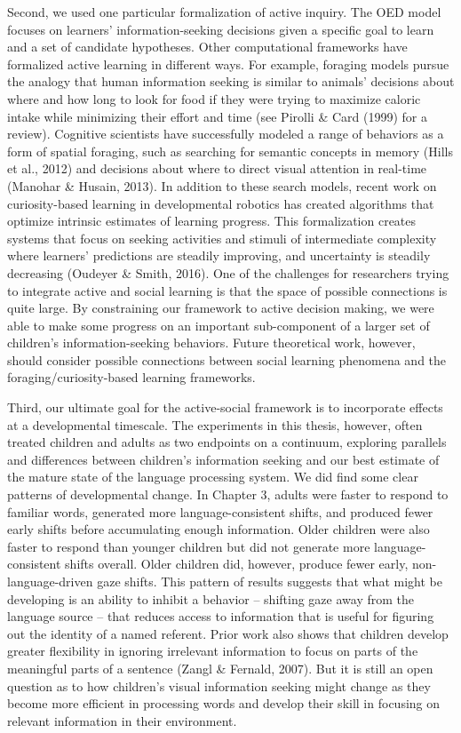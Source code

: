 \documentclass[oneside]{report}
\begin{document}
Second, we used one particular formalization of active inquiry. The OED
model focuses on learners' information-seeking decisions given a
specific goal to learn and a set of candidate hypotheses. Other
computational frameworks have formalized active learning in different
ways. For example, foraging models pursue the analogy that human
information seeking is similar to animals' decisions about where and how
long to look for food if they were trying to maximize caloric intake
while minimizing their effort and time (see Pirolli \& Card (1999) for a
review). Cognitive scientists have successfully modeled a range of
behaviors as a form of spatial foraging, such as searching for semantic
concepts in memory (Hills et al., 2012) and decisions about where to
direct visual attention in real-time (Manohar \& Husain, 2013). In
addition to these search models, recent work on curiosity-based learning
in developmental robotics has created algorithms that optimize intrinsic
estimates of learning progress. This formalization creates systems that
focus on seeking activities and stimuli of intermediate complexity where
learners' predictions are steadily improving, and uncertainty is
steadily decreasing (Oudeyer \& Smith, 2016). One of the challenges for
researchers trying to integrate active and social learning is that the
space of possible connections is quite large. By constraining our
framework to active decision making, we were able to make some progress
on an important sub-component of a larger set of children's
information-seeking behaviors. Future theoretical work, however, should
consider possible connections between social learning phenomena and the
foraging/curiosity-based learning frameworks.

Third, our ultimate goal for the active-social framework is to
incorporate effects at a developmental timescale. The experiments in
this thesis, however, often treated children and adults as two endpoints
on a continuum, exploring parallels and differences between children's
information seeking and our best estimate of the mature state of the
language processing system. We did find some clear patterns of
developmental change. In Chapter 3, adults were faster to respond to
familiar words, generated more language-consistent shifts, and produced
fewer early shifts before accumulating enough information. Older
children were also faster to respond than younger children but did not
generate more language-consistent shifts overall. Older children did,
however, produce fewer early, non-language-driven gaze shifts. This
pattern of results suggests that what might be developing is an ability
to inhibit a behavior -- shifting gaze away from the language source --
that reduces access to information that is useful for figuring out the
identity of a named referent. Prior work also shows that children
develop greater flexibility in ignoring irrelevant information to focus
on parts of the meaningful parts of a sentence (Zangl \& Fernald, 2007).
But it is still an open question as to how children's visual information
seeking might change as they become more efficient in processing words
and develop their skill in focusing on relevant information in their
environment.
\end{document}
